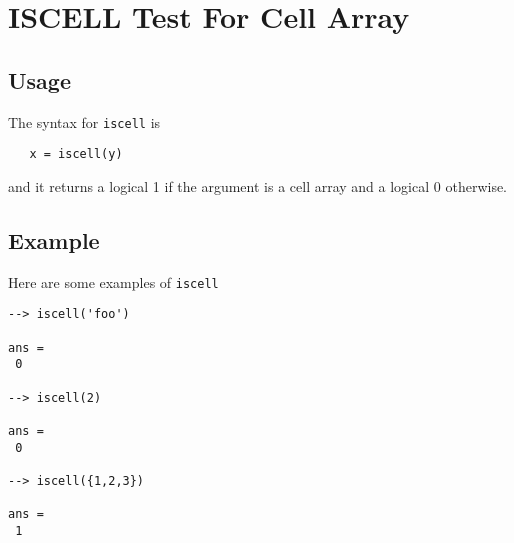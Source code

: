 \section{ISCELL Test For Cell Array}

\subsection{Usage}

The syntax for \verb|iscell| is 
\begin{verbatim}
   x = iscell(y)
\end{verbatim}
and it returns a logical 1 if the argument is a cell array
and a logical 0 otherwise.
\subsection{Example}

Here are some examples of \verb|iscell|
\begin{verbatim}
--> iscell('foo')

ans = 
 0 

--> iscell(2)

ans = 
 0 

--> iscell({1,2,3})

ans = 
 1 
\end{verbatim}
